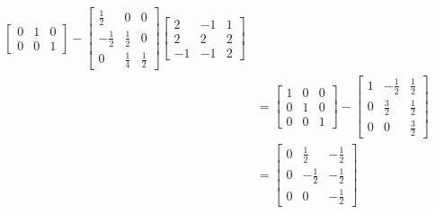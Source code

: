 \documentclass[11pt, letterpaper]{article}
\begin{document}
\begin{align*}
\begin{bmatrix}
        0 & 1 & 0\\
        0 & 0 & 1
    \end{bmatrix}
    -
    \begin{bmatrix}
        \frac{1}{2} & 0 & 0\\
        -\frac{1}{2} & \frac{1}{2} & 0\\
        0 & \frac{1}{4} & \frac{1}{2} 
    \end{bmatrix}
    \begin{bmatrix}
        2 & -1 & 1\\
        2 & 2 & 2\\
        -1 & -1 & 2
    \end{bmatrix}\\
    &=
    \begin{bmatrix}
        1 & 0 & 0 \\
        0 & 1 & 0\\
        0 & 0 & 1
    \end{bmatrix}
    -
    \begin{bmatrix}
        1 & -\frac{1}{2} & \frac{1}{2}\\
        0 & \frac{3}{2} & \frac{1}{2}\\
        0 & 0 & \frac{3}{2}
    \end{bmatrix}\\
    &=
    \begin{bmatrix}
        0 & \frac{1}{2} & -\frac{1}{2}\\
        0 & -\frac{1}{2} & -\frac{1}{2}\\
        0 & 0 & -\frac{1}{2}
    \end{bmatrix}\\
\end{align*}
\end{document}
